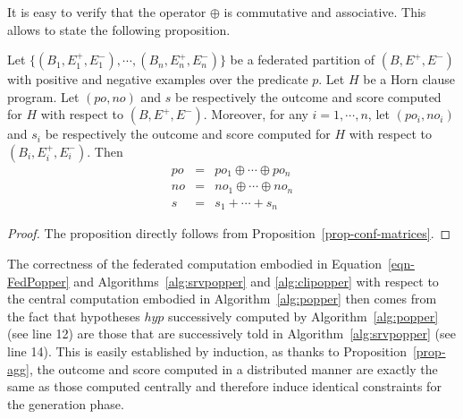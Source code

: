 It is easy to verify that the operator $\oplus$ is commutative and associative. This allows to state the following proposition.

\begin{proposition}
\label{prop-agg}
Let \( \{ (B_1, E_1^+,E_1^-), \cdots, (B_n, E_n^+,E_n^-) \}
\)
be a federated partition of $(B, E^+,E^-)$ with positive and negative examples over the predicate $p$. Let $H$ be a Horn clause program. Let 
$(po,no)$ and $s$ be respectively the outcome and score computed for $H$ with respect to $(B, E^+,E^-)$. Moreover, for any $i=1, \cdots, n$, let $(po_i,no_i)$ and $s_i$ be respectively the outcome and score computed for $H$ with respect to $(B_i, E_i^+,E_i^-)$. Then 
\begin{eqnarray*}
    po & = & po_1 \oplus \cdots \oplus po_n \\
    no & = & no_1 \oplus \cdots \oplus no_n \\
    s  & = & s_1 + \cdots + s_n
\end{eqnarray*} 
\end{proposition}

\begin{proof}
The proposition directly follows from Proposition~\ref{prop-conf-matrices}.
\end{proof}

The correctness of the federated computation embodied in Equation~\ref{eqn-FedPopper} and Algorithms~\ref{alg:srvpopper} and \ref{alg:clipopper} with respect to the central computation embodied in Algorithm~\ref{alg:popper} then comes from the fact that hypotheses $hyp$ successively computed by Algorithm~\ref{alg:popper} (see line 12) are those that are successively told in Algorithm~\ref{alg:srvpopper} (see line 14). This is easily established by induction, as thanks to Proposition~\ref{prop-agg}, the outcome and score computed in a distributed manner 
are exactly the same as those computed centrally and therefore induce identical constraints for the generation phase.

